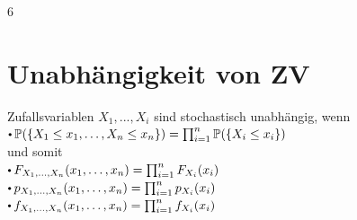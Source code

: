 \documentclass[8pt,a4paper,landscape]{extarticle}
\begin{document}
\begin{multicols*}{6}
\columnbreak
%

\section{Unabhängigkeit von ZV}
%
Zufallsvariablen $X_1, ... ,X_i$ sind stochastisch unabhängig, wenn \\ 
$\sbullet  \mathbb{P}(\{X_1 \le x_1, \dots, X_n \le x_n\}) = \prod_{i=1}^{n} \mathbb{P}(\{X_i \le x_i\})$ \\
und somit \\
$\sbullet F_{X_1, \dots, X_n}(x_1, \dots, x_n) = \prod_{i=1}^{n} F_{X_i}(x_i)$ \\
$\sbullet p_{X_1, \dots, X_n}(x_1, \dots, x_n) = \prod_{i=1}^{n} p_{X_i}(x_i)$ \\
$\sbullet f_{X_1, \dots, X_n}(x_1, \dots, x_n) = \prod_{i=1}^{n} f_{X_i}(x_i)$


\end{multicols*}
\end{document}
